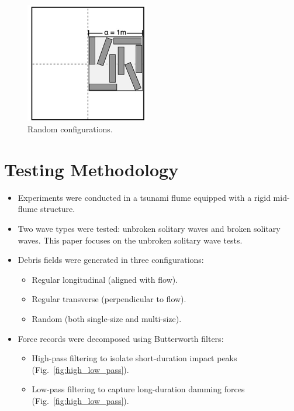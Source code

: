 \documentclass{article}
\begin{document}
\begin{figure}[htbp]
    \centering
    \includegraphics[width=0.48\textwidth]{configurations_rand.jpg}
    \caption{Random configurations.}
    \label{fig:configurations_random}
\end{figure}

\section{Testing Methodology}
\begin{itemize}
    \item Experiments were conducted in a tsunami flume equipped with a rigid mid-flume structure.
    \item Two wave types were tested: unbroken solitary waves and broken solitary waves. This paper focuses on the unbroken solitary wave tests. 
    \item Debris fields were generated in three configurations:
    \begin{itemize}
        \item Regular longitudinal (aligned with flow).
        \item Regular transverse (perpendicular to flow).
        \item Random (both single-size and multi-size).
    \end{itemize}
    \item Force records were decomposed using Butterworth filters:
    \begin{itemize}
        \item High-pass filtering to isolate short-duration impact peaks (Fig.~\ref{fig:high_low_pass}).
        \item Low-pass filtering to capture long-duration damming forces (Fig.~\ref{fig:high_low_pass}).
    \end{itemize}
\end{itemize}
\end{document}
